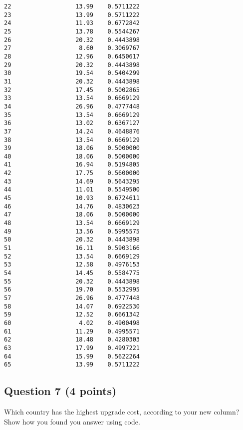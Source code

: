 \documentclass[
]{article}
\newenvironment{Shaded}{\begin{snugshade}}{\end{snugshade}}
\newcommand{\FunctionTok}[1]{\textcolor[rgb]{0.13,0.29,0.53}{\textbf{#1}}}
\newcommand{\NormalTok}[1]{#1}
\newcommand{\OtherTok}[1]{\textcolor[rgb]{0.56,0.35,0.01}{#1}}
\newcommand{\SpecialCharTok}[1]{\textcolor[rgb]{0.81,0.36,0.00}{\textbf{#1}}}
\begin{document}
\begin{verbatim}
22                  13.99    0.5711222
23                  13.99    0.5711222
24                  11.93    0.6772842
25                  13.78    0.5544267
26                  20.32    0.4443898
27                   8.60    0.3069767
28                  12.96    0.6450617
29                  20.32    0.4443898
30                  19.54    0.5404299
31                  20.32    0.4443898
32                  17.45    0.5002865
33                  13.54    0.6669129
34                  26.96    0.4777448
35                  13.54    0.6669129
36                  13.02    0.6367127
37                  14.24    0.4648876
38                  13.54    0.6669129
39                  18.06    0.5000000
40                  18.06    0.5000000
41                  16.94    0.5194805
42                  17.75    0.5600000
43                  14.69    0.5643295
44                  11.01    0.5549500
45                  10.93    0.6724611
46                  14.76    0.4830623
47                  18.06    0.5000000
48                  13.54    0.6669129
49                  13.56    0.5995575
50                  20.32    0.4443898
51                  16.11    0.5903166
52                  13.54    0.6669129
53                  12.58    0.4976153
54                  14.45    0.5584775
55                  20.32    0.4443898
56                  19.70    0.5532995
57                  26.96    0.4777448
58                  14.07    0.6922530
59                  12.52    0.6661342
60                   4.02    0.4900498
61                  11.29    0.4995571
62                  18.48    0.4280303
63                  17.99    0.4997221
64                  15.99    0.5622264
65                  13.99    0.5711222
\end{verbatim}

\subsection{Question 7 (4 points)}\label{question-7-4-points}

Which country has the highest upgrade cost, according to your new
column? Show how you found you answer using code.

\begin{Shaded}
\end{Shaded}
\end{document}
